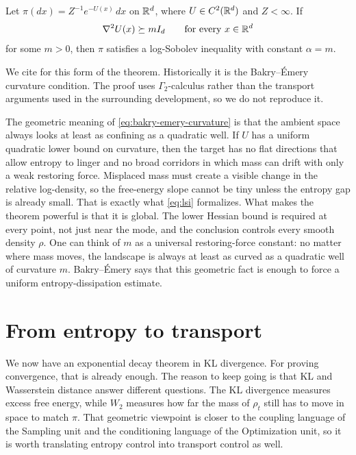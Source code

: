 \documentclass[11pt]{article}
\begin{document}
\begin{theorem}
\label{thm:bakry-emery}
Let $\pi(dx)=Z^{-1}e^{-U(x)}\,dx$ on $\mathbb{R}^d$, where $U\in C^2(\mathbb{R}^d)$ and $Z<\infty$.
If
\begin{equation}
  \nabla^2 U(x)\succeq mI_d
  \qquad\text{for every }x\in\mathbb{R}^d
  \label{eq:bakry-emery-curvature}
\end{equation}
for some $m>0$, then $\pi$ satisfies a log-Sobolev inequality with constant $\alpha=m$.
\end{theorem}

We cite \citet[Thm.~2]{otto_villani_2000_talagrand_lsi} for this form of the theorem.
Historically it is the Bakry--\'Emery curvature condition.
The proof uses $\Gamma_2$-calculus rather than the transport arguments used in the surrounding development, so we do not reproduce it.

The geometric meaning of \eqref{eq:bakry-emery-curvature} is that the ambient space always looks at least as confining as a quadratic well.
If $U$ has a uniform quadratic lower bound on curvature, then the target has no flat directions that allow entropy to linger and no broad corridors in which mass can drift with only a weak restoring force.
Misplaced mass must create a visible change in the relative log-density, so the free-energy slope cannot be tiny unless the entropy gap is already small.
That is exactly what \eqref{eq:lsi} formalizes.
What makes the theorem powerful is that it is global.
The lower Hessian bound is required at every point, not just near the mode, and the conclusion controls every smooth density $\rho$.
One can think of $m$ as a universal restoring-force constant: no matter where mass moves, the landscape is always at least as curved as a quadratic well of curvature $m$.
Bakry--\'Emery says that this geometric fact is enough to force a uniform entropy-dissipation estimate.

\section{From entropy to transport}
\label{sec:entropy-to-transport}

We now have an exponential decay theorem in KL divergence.
For proving convergence, that is already enough.
The reason to keep going is that KL and Wasserstein distance answer different questions.
The KL divergence measures excess free energy, while $W_2$ measures how far the mass of $\rho_t$ still has to move in space to match $\pi$.
That geometric viewpoint is closer to the coupling language of the Sampling unit and the conditioning language of the Optimization unit, so it is worth translating entropy control into transport control as well.
\end{document}
